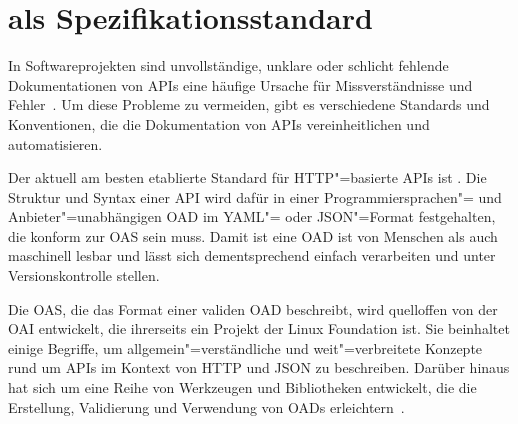 \chapter{\OA als Spezifikationsstandard} \label{ch:openapi}
In Softwareprojekten sind unvollständige, unklare oder schlicht fehlende Dokumentationen von \acp{API} eine häufige Ursache für Missverständnisse und Fehler~\cite{ope23a}.
Um diese Probleme zu vermeiden, gibt es verschiedene Standards und Konventionen, die die Dokumentation von \acp{API} vereinheitlichen und automatisieren.

Der aktuell am besten etablierte Standard für \ac{HTTP}"=basierte \acp{API} ist \OA\@.
Die Struktur und Syntax einer \ac{API} wird dafür in einer Programmiersprachen"= und Anbieter"=unabhängigen \ac{OAD} im \acs{YAML}"= oder \acs{JSON}"=Format festgehalten, die konform zur \ac{OAS} sein muss.
Damit ist eine \ac{OAD} ist von Menschen als auch maschinell lesbar und lässt sich dementsprechend  einfach verarbeiten und unter Versionskontrolle stellen.

Die \ac{OAS}, die das Format einer validen \ac{OAD} beschreibt, wird quelloffen von der \ac{OAI} entwickelt, die ihrerseits ein Projekt der Linux Foundation ist.
Sie beinhaltet einige Begriffe, um allgemein"=verständliche und weit"=verbreitete Konzepte rund um \acp{API} im Kontext von \acs{HTTP} und \acs{JSON} zu beschreiben.
Darüber hinaus hat sich um \OA eine Reihe von Werkzeugen und Bibliotheken entwickelt, die die Erstellung, Validierung und Verwendung von \acp{OAD} erleichtern~\cites{ope,ope23,ope23a}.

